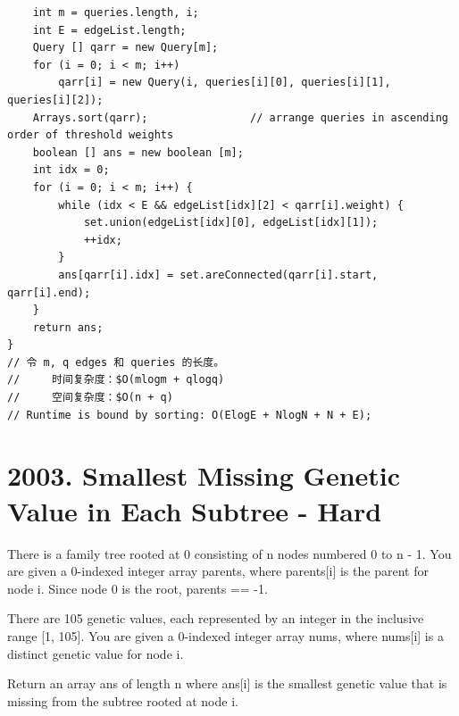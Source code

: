 \documentclass[9pt, b5paaper]{book}
\begin{document}
\begin{verbatim}
    int m = queries.length, i;
    int E = edgeList.length;
    Query [] qarr = new Query[m];
    for (i = 0; i < m; i++) 
        qarr[i] = new Query(i, queries[i][0], queries[i][1], queries[i][2]);
    Arrays.sort(qarr);                // arrange queries in ascending order of threshold weights
    boolean [] ans = new boolean [m];
    int idx = 0;
    for (i = 0; i < m; i++) {
        while (idx < E && edgeList[idx][2] < qarr[i].weight) {
            set.union(edgeList[idx][0], edgeList[idx][1]);
            ++idx;
        }
        ans[qarr[i].idx] = set.areConnected(qarr[i].start, qarr[i].end);
    }
    return ans;
}
// 令 m, q edges 和 queries 的长度。
//     时间复杂度：$O(mlogm + qlogq)
//     空间复杂度：$O(n + q)
// Runtime is bound by sorting: O(ElogE + NlogN + N + E);
\end{verbatim}

\section{2003. Smallest Missing Genetic Value in Each Subtree - Hard}
\label{sec-17-2}
There is a family tree rooted at 0 consisting of n nodes numbered 0 to n - 1. You are given a 0-indexed integer array parents, where parents[i] is the parent for node i. Since node 0 is the root, parents\footnotemark[2]{} == -1.

There are 105 genetic values, each represented by an integer in the inclusive range [1, 105]. You are given a 0-indexed integer array nums, where nums[i] is a distinct genetic value for node i.

Return an array ans of length n where ans[i] is the smallest genetic value that is missing from the subtree rooted at node i.
\end{document}
